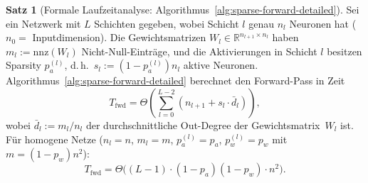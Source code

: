 \documentclass[a4paper,12pt]{report}
\theoremstyle{definition}
\newtheorem{satz}{Satz}
\begin{document}
	\begin{satz}[Formale Laufzeitanalyse: Algorithmus~\ref{alg:sparse-forward-detailed}]
		\label{satz:laufzeit-sparse-forward}
		Sei ein Netzwerk mit $L$ Schichten gegeben, wobei Schicht $l$ genau $n_l$ Neuronen hat ($n_0 = $ Inputdimension). Die Gewichtsmatrizen $W_l \in \mathbb{R}^{n_{l+1} \times n_l}$ haben $m_l := \mathrm{nnz}(W_l)$ Nicht-Null-Einträge, und die Aktivierungen in Schicht $l$ besitzen Sparsity $p_a^{(l)}$, d.\,h.\ $s_l := (1-p_a^{(l)}) n_l$ aktive Neuronen. Algorithmus~\ref{alg:sparse-forward-detailed} berechnet den Forward-Pass in Zeit
		\[
			T_{\mathrm{fwd}} = \Theta\!\left(\sum_{l=0}^{L-2} \left(n_{l+1} + s_l \cdot \bar{d}_l\right)\right),
		\]
		wobei $\bar{d}_l := m_l / n_l$ der durchschnittliche Out-Degree der Gewichtsmatrix~$W_l$ ist.
		Für homogene Netze ($n_l = n$, $m_l = m$, $p_a^{(l)} = p_a$, $p_w^{(l)} = p_w$ mit $m = (1-p_w)n^2$):
		\[
			T_{\mathrm{fwd}} = \Theta\!\bigl((L-1) \cdot (1-p_a)(1-p_w) \cdot n^2\bigr).
		\]
	\end{satz}
\end{document}
